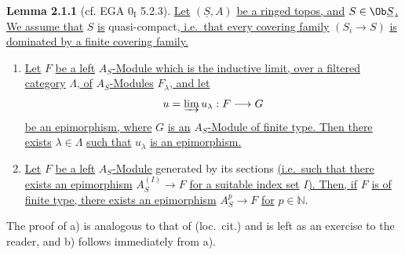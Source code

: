 \textbf{Lemma 2.1.1} (cf. EGA $0_{\mathrm I}$ 5.2.3). \uline{Let} $(\underline{S},A)$ \uline{be a ringed topos, and} $S\in\Ob \underline{S}$\uline{. We assume that} $S$ \uline{is} quasi-compact\uline{, i.e.\ that every covering family} $(S_i\to S)$ \uline{is dominated by a finite covering family.}
\begin{enumerate}[label=\alph*)]
\item \uline{Let} $F$ \uline{be a left} $A_S$\uline{-Module which is the inductive limit, over a filtered category} $\Lambda$\uline{, of} $A_S$\uline{-Modules} $F_\lambda$\uline{, and let}
\[
u=\varinjlim u_\lambda:F\longrightarrow G
\]
\uline{be an epimorphism, where} $G$ \uline{is an} $A_S$\uline{-Module of finite type. Then there exists} $\lambda\in\Lambda$ \uline{such that} $u_\lambda$ \uline{is an epimorphism.}
\item \uline{Let} $F$ \uline{be a left} $A_S$\uline{-Module} generated by its sections \uline{(i.e.\ such that there exists an epimorphism} $A_S^{(I)}\to F$ \uline{for a suitable index set} $I$\uline{). Then, if} $F$ \uline{is of finite type, there exists an epimorphism} $A_S^p\to F$ \uline{for} $p\in\mathbb N$.
\end{enumerate}
The proof of a) is analogous to that of (loc.\ cit.) and is left as an exercise to the reader, and b) follows immediately from a).

